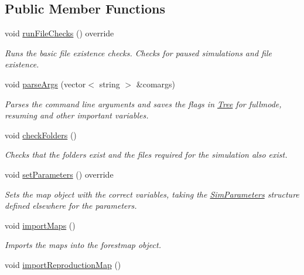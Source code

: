 \subsection*{Public Member Functions}
\begin{DoxyCompactItemize}
\item 
void \hyperlink{class_spatial_tree_a060fb8be17d702ed5eb0c142a89d9773}{run\+File\+Checks} () override\hypertarget{class_spatial_tree_a060fb8be17d702ed5eb0c142a89d9773}{}\label{class_spatial_tree_a060fb8be17d702ed5eb0c142a89d9773}

\begin{DoxyCompactList}\small\item\em Runs the basic file existence checks. Checks for paused simulations and file existence. \end{DoxyCompactList}\item 
void \hyperlink{class_spatial_tree_ad6a5412bccbccc92a302b2fb05bbced2}{parse\+Args} (vector$<$ string $>$ \&comargs)
\begin{DoxyCompactList}\small\item\em Parses the command line arguments and saves the flags in \hyperlink{class_tree}{Tree} for fullmode, resuming and other important variables. \end{DoxyCompactList}\item 
void \hyperlink{class_spatial_tree_aef0097abc7c616ed656e26b4055834c3}{check\+Folders} ()\hypertarget{class_spatial_tree_aef0097abc7c616ed656e26b4055834c3}{}\label{class_spatial_tree_aef0097abc7c616ed656e26b4055834c3}

\begin{DoxyCompactList}\small\item\em Checks that the folders exist and the files required for the simulation also exist. \end{DoxyCompactList}\item 
void \hyperlink{class_spatial_tree_a0c83bcd9a84f4fa98c78b75a78a9a012}{set\+Parameters} () override
\begin{DoxyCompactList}\small\item\em Sets the map object with the correct variables, taking the \hyperlink{struct_sim_parameters}{Sim\+Parameters} structure defined elsewhere for the parameters. \end{DoxyCompactList}\item 
void \hyperlink{class_spatial_tree_ab9603c25cd1c8466d1e4bfa3f73f191f}{import\+Maps} ()
\begin{DoxyCompactList}\small\item\em Imports the maps into the forestmap object. \end{DoxyCompactList}\item 
void \hyperlink{class_spatial_tree_a5d9f29a12f8b66798139c89f153130db}{import\+Reproduction\+Map} ()\hypertarget{class_spatial_tree_a5d9f29a12f8b66798139c89f153130db}{}\label{class_spatial_tree_a5d9f29a12f8b66798139c89f153130db}


\end{DoxyCompactItemize}
